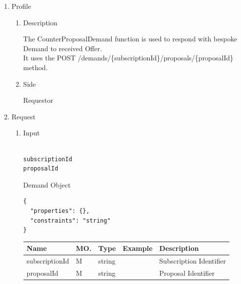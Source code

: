 \newpage


\begin{enumerate}

\item Profile

\begin{enumerate}

\item Description

The CounterProposalDemand function is used to respond with bespoke Demand to received Offer. \\
It uses the POST /demands/\{subscriptionId\}/proposals/\{proposalId\} method.

\item Side

Requestor

\end{enumerate}

\item Request

\begin{enumerate}

\item Input

\begin{tcolorbox}[boxrule=0pt, frame empty]
\begin{verbatim}

subscriptionId
proposalId

\end{verbatim}
\end{tcolorbox}

Demand Object
\begin{tcolorbox}[boxrule=0pt, frame empty]
\begin{verbatim}
{
  "properties": {},
  "constraints": "string"
}
\end{verbatim}
\end{tcolorbox}

\begin{center}
\begin{tabular}{|p{3cm}|l|p{3cm}|p{3cm}|p{4cm}|} 
\hline
\rowcolor{lightgray}	Name	& MO.	& Type	& Example & 	Description \\
\hline

subscriptionId	& M	& 	string			&		&	Subscription Identifier \\ 

\hline

proposalId		& M & 	string			&		&	Proposal Identifier \\


\end{tabular}
\end{center}
\end{enumerate}
\end{enumerate}
